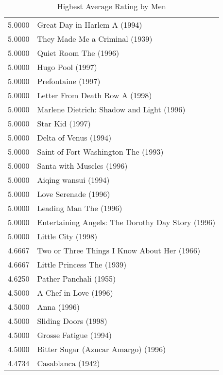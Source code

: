 \begin{flushleft}
\begin{table}[h]
\setlength{\tabcolsep}{12pt}
\centering
\begin{tabular}{|ll|}
\hline
5.0000 & Great Day in Harlem A (1994)                            \\
5.0000 & They Made Me a Criminal (1939)                          \\
5.0000 & Quiet Room The (1996)                                   \\
5.0000 & Hugo Pool (1997)                                        \\
5.0000 & Prefontaine (1997)                                      \\
5.0000 & Letter From Death Row A (1998)                          \\
5.0000 & Marlene Dietrich: Shadow and Light (1996)               \\
5.0000 & Star Kid (1997)                                         \\
5.0000 & Delta of Venus (1994)                                   \\
5.0000 & Saint of Fort Washington The (1993)                     \\
5.0000 & Santa with Muscles (1996)                               \\
5.0000 & Aiqing wansui (1994)                                    \\
5.0000 & Love Serenade (1996)                                    \\
5.0000 & Leading Man The (1996)                                  \\
5.0000 & Entertaining Angels: The Dorothy Day Story (1996)       \\
5.0000 & Little City (1998)                                      \\ \hline
4.6667 & Two or Three Things I Know About Her (1966)             \\
4.6667 & Little Princess The (1939)                              \\ \hline
4.6250 & Pather Panchali (1955)                                  \\ \hline
4.5000 & A Chef in Love (1996)                                   \\  
4.5000 & Anna (1996)                                             \\
4.5000 & Sliding Doors (1998)                                    \\
4.5000 & Grosse Fatigue (1994)                                   \\
4.5000 & Bitter Sugar (Azucar Amargo) (1996)                     \\ \hline
4.4734 & Casablanca (1942)                                       \\    \hline

\end{tabular}
\caption{Highest Average Rating by Men}
\end{table}




\end{flushleft}




